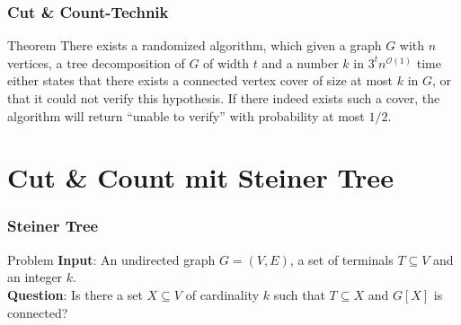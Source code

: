 \documentclass{beamer}
\begin{document}
\begin{frame}
\frametitle{Cut \& Count-Technik}
\begin{block}{Theorem}
There exists a randomized algorithm, which given a graph $G$ with $n$ vertices, a tree decomposition of
$G$ of width $t$ and a number $k$ in $3^tn^{\mathcal{O}(1)}$ time either states that there exists a connected vertex cover of size at most $k$
in $G$, or that it could not verify this hypothesis. If there indeed exists such a cover, the algorithm will return “unable
to verify” with probability at most $1/2$.
\end{block}
\end{frame}

\section{Cut \& Count mit Steiner Tree} %
\begin{frame}
\frametitle{Steiner Tree}
\begin{block}{Problem}
\textbf{Input}: An undirected graph $G = (V, E)$, a set of terminals $T \subseteq V$ and an integer $k$. \\
\textbf{Question}: Is there a set $X \subseteq V$ of cardinality $k$ such that $T \subseteq X$ and $G[X]$ is connected?
\end{block}
\end{frame}
\end{document}
